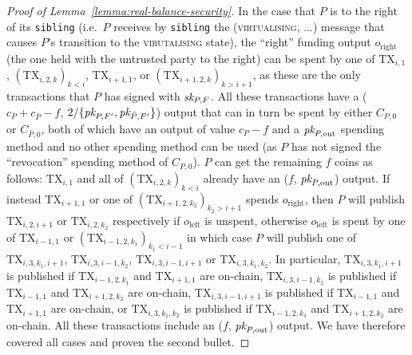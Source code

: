 \begin{proof}[Proof of Lemma~\ref{lemma:real-balance-security}]
  In the case that $P$ is to the right of its \texttt{sibling} (i.e.\ $P$
  receives by \texttt{sibling} the (\textsc{virtualising}, $\dots$) message that
  causes $P$'s transition to the \textsc{virutalising} state), the ``right''
  funding output $o_{\mathrm{right}}$ (the one held with the untrusted party to
  the right) can be spent by one of $\mathrm{TX}_{i, 1}$, $(\mathrm{TX}_{i, 2,
  k})_{k < i}$, $\mathrm{TX}_{i+1, 1}$, or $(\mathrm{TX}_{i+1, 2, k})_{k >
  i+1}$, as these are the only transactions that $P$ has signed with $\textit{sk}_{P,
  F}$. All these transactions have a ($c_P + c_{\bar{P}} - f$, $2/\{\textit{pk}_{P, F'},
  \textit{pk}_{\bar{P}, F'}\}$) output that can in turn be spent by either $C_{P, 0}$ or
  $C_{\bar{P}, 0}$, both of which have an output of value $c_P-f$ and a $\textit{pk}_{P,
  \mathrm{out}}$ spending method and no other spending method can be used (as
  $P$ has not signed the ``revocation'' spending method of $C_{P, 0}$). $P$ can
  get the remaining $f$ coins as follows: $\mathrm{TX}_{i, 1}$ and all of
  $(\mathrm{TX}_{i, 2, k})_{k < i}$ already have an ($f$, $\textit{pk}_{P,
  \mathrm{out}}$) output. If instead $\mathrm{TX}_{i+1, 1}$ or one of
  $(\mathrm{TX}_{i+1, 2, k_2})_{k_2 > i+1}$ spends $o_{\mathrm{right}}$, then
  $P$ will publish $\mathrm{TX}_{i, 2, i+1}$ or $\mathrm{TX}_{i, 2, k_2}$
  respectively if $o_{\mathrm{left}}$ is unspent, otherwise $o_{\mathrm{left}}$
  is spent by one of $\mathrm{TX}_{i-1, 1}$ or $(\mathrm{TX}_{i-1, 2, k_1})_{k_1
  < i-1}$ in which case $P$ will publish one of $\mathrm{TX}_{i, 3, k_1, i+1}$,
  $\mathrm{TX}_{i, 3, i-1, k_2}$, $\mathrm{TX}_{i, 3, i-1, i+1}$ or
  $\mathrm{TX}_{i, 3, k_1, k_2}$. In particular, $\mathrm{TX}_{i, 3, k_1, i+1}$
  is published if $\mathrm{TX}_{i-1, 2, k_1}$ and $\mathrm{TX}_{i+1, 1}$ are
  on-chain, $\mathrm{TX}_{i, 3, i-1, k_2}$ is published if $\mathrm{TX}_{i-1,
  1}$ and $\mathrm{TX}_{i+1, 2, k_2}$ are on-chain, $\mathrm{TX}_{i, 3, i-1,
  i+1}$ is published if $\mathrm{TX}_{i-1, 1}$ and $\mathrm{TX}_{i+1, 1}$ are
  on-chain, or $\mathrm{TX}_{i, 3, k_1, k_2}$ is published if $\mathrm{TX}_{i-1,
  2, k_1}$ and $\mathrm{TX}_{i+1, 2, k_2}$ are on-chain.  All these transactions
  include an ($f$, $\textit{pk}_{P, \mathrm{out}}$) output. We have therefore covered all
  cases and proven the second bullet.


\end{proof}
